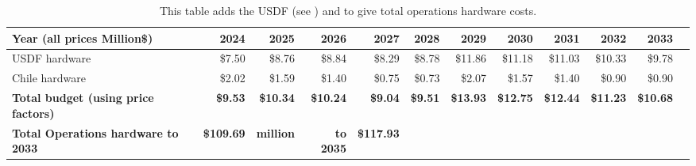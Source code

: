 \tiny \begin{longtable} { |p{}  |r  |r  |r  |r  |r  |r  |r  |r  |r  |r  |r |} 
\caption{This table adds the USDF (see ) and  to give total operations hardware costs. \label{tab:opsSummary}}\\ 
\hline 
\textbf{Year  (all prices Million\$)}&\textbf{2024}&\textbf{2025}&\textbf{2026}&\textbf{2027}&\textbf{2028}&\textbf{2029}&\textbf{2030}&\textbf{2031}&\textbf{2032}&\textbf{2033} \\ \hline
{USDF hardware}&{\$7.50}&{\$8.76}&{\$8.84}&{\$8.29}&{\$8.78}&{\$11.86}&{\$11.18}&{\$11.03}&{\$10.33}&{\$9.78} \\ \hline
{Chile hardware}&{\$2.02}&{\$1.59}&{\$1.40}&{\$0.75}&{\$0.73}&{\$2.07}&{\$1.57}&{\$1.40}&{\$0.90}&{\$0.90} \\ \hline
\textbf{Total budget (using price factors)}&\textbf{\$9.53}&\textbf{\$10.34}&\textbf{\$10.24}&\textbf{\$9.04}&\textbf{\$9.51}&\textbf{\$13.93}&\textbf{\$12.75}&\textbf{\$12.44}&\textbf{\$11.23}&\textbf{\$10.68} \\ \hline
\textbf{Total Operations hardware to 2033}&\textbf{\$109.69}&\textbf{million}&\textbf{to 2035}&\textbf{\$117.93}&&&&&& \\ \hline
\end{longtable} \normalsize
